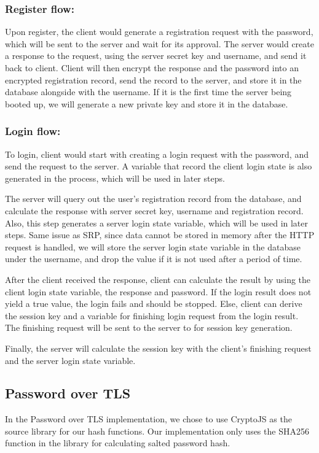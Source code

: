 \subsubsection{Register flow:}
Upon register, the client would generate a registration request with the password, which will be sent to the server and wait for its approval.
The server would create a response to the request, using the server secret key and username, and send it back to client.
Client will then encrypt the response and the password into an encrypted registration record, send the record to the server, and store it in the database alongside with the username.
If it is the first time the server being booted up, we will generate a new private key and store it in the database.

\subsubsection{Login flow:}
To login, client would start with creating a login request with the password, and send the request to the server.
A variable that record the client login state is also generated in the process, which will be used in later steps.

The server will query out the user's registration record from the database, and calculate the response with server secret key, username and registration record.
Also, this step generates a server login state variable, which will be used in later steps.
Same issue as SRP, since data cannot be stored in memory after the HTTP request is handled, we will store the server login state variable in the database under the username, and drop the value if it is not used after a period of time.

After the client received the response, client can calculate the result by using the client login state variable, the response and password.
If the login result does not yield a true value, the login fails and should be stopped.
Else, client can derive the session key and a variable for finishing login request from the login result.
The finishing request will be sent to the server to for session key generation.

Finally, the server will calculate the session key with the client's finishing request and the server login state variable.




\subsection{Password over TLS}
In the Password over TLS implementation, we chose to use CryptoJS as the source library for our hash functions.
Our implementation only uses the SHA256 function in the library for calculating salted password hash.

